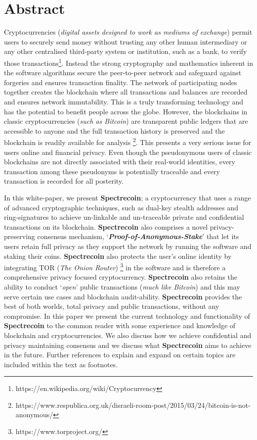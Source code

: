 \section{Abstract}
Cryptocurrencies (\textit{digital assets designed to work as mediums of exchange})
permit users to securely send money without trusting any other human intermediary
or any other centralised third-party system or institution, such as a bank, to
verify those transactions\footnote{https://en.wikipedia.org/wiki/Cryptocurrency}.
Instead the strong cryptography and mathematics inherent in the software
algorithms secure the peer-to-peer network and safeguard against forgeries and
ensures transaction finality. The network of participating nodes together
creates the blockchain where all transactions and balances are recorded and
ensures network immutability. This is a truly transforming technology and has
the potential to benefit people across the globe. However, the blockchains in
classic cryptocurrencies (\textit{such as Bitcoin}) are transparent public
ledgers that are accessible to anyone and the full transaction history is
preserved and the blockchain is readily available for analysis
\footnote{https://www.respublica.org.uk/disraeli-room-post/2015/03/24/bitcoin-is-not-anonymous/}.
This presents a very serious issue for users online and financial privacy.
Even though the pseudonymous users of classic blockchains are not directly
associated with their real-world identities, every transaction among these
pseudonyms is potentially traceable and every transaction is recorded for
all posterity.

In this white-paper, we present \textbf{Spectrecoin}; a cryptocurrency that
uses a range of advanced cryptographic techniques, such as dual-key stealth
addresses and ring-signatures to achieve un-linkable and un-traceable
private and confidential transactions on its blockchain. \textbf{Spectrecoin}
also comprises a novel privacy-preserving consensus mechanism,
‘\textbf{\textit{Proof-of-Anonymous-Stake}}’ that let its users retain
full privacy as they support the network by running the software and
staking their coins. \textbf{Spectrecoin} also protects the user’s online
identity by integrating TOR (\textit{The Onion Router})
\footnote{https://www.torproject.org/} in the software and is therefore a
comprehensive privacy focused cryptocurrency. \textbf{Spectrecoin} also
retains the ability to conduct ‘\textit{open}’ public transactions
(\textit{much like Bitcoin}) and this may serve certain use cases and
blockchain audit-ability. \textbf{Spectrecoin} provides the best of both
worlds, total privacy and public transactions, without any compromise.
In this paper we present the current technology and functionality of
\textbf{Spectrecoin} to the common reader with some experience and knowledge
of blockchain and cryptocurrencies. We also discuss how we achieve
confidential and privacy maintaining consensus and we discuss what
\textbf{Spectrecoin} aims to achieve in the future. Further references
to explain and expand on certain topics are included within the text as
footnotes.
